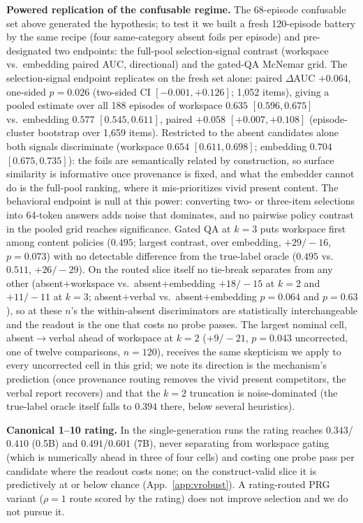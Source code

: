 \textbf{Powered replication of the confusable regime.} The 68-episode
confusable set above generated the hypothesis; to test it we built a fresh
120-episode battery by the same recipe (four same-category absent foils per
episode) and pre-designated two endpoints: the full-pool selection-signal
contrast (workspace vs.\ embedding paired AUC, directional) and the gated-QA
McNemar grid. The selection-signal endpoint replicates on the fresh set
alone: paired $\Delta$AUC $+0.064$, one-sided $p{=}0.026$ (two-sided CI
$[-0.001, +0.126]$; 1{,}052 items), giving a pooled estimate over all 188
episodes of workspace $0.635$ $[0.596, 0.675]$ vs.\ embedding $0.577$
$[0.545, 0.611]$, paired $+0.058$ $[+0.007, +0.108]$ (episode-cluster
bootstrap over 1{,}659 items). Restricted to
the absent candidates alone both signals discriminate (workspace $0.654$
$[0.611, 0.698]$; embedding $0.704$ $[0.675, 0.735]$): the foils are
semantically related by construction, so surface similarity is informative
once provenance is fixed, and what the embedder cannot do is the full-pool
ranking, where it mis-prioritizes vivid present content. The behavioral
endpoint is null at this power: converting two- or
three-item selections into 64-token answers adds noise that dominates, and
no pairwise policy contrast in the pooled grid reaches significance.
Gated QA at $k{=}3$ puts workspace first among content policies
($0.495$; largest contrast, over embedding, $+29/-16$, $p{=}0.073$) with no
detectable difference from the true-label oracle ($0.495$ vs.\ $0.511$,
$+26/-29$). On the routed slice itself no tie-break separates from any
other (absent$+$workspace vs.\ absent$+$embedding $+18/-15$ at $k{=}2$ and
$+11/-11$ at $k{=}3$; absent$+$verbal vs.\ absent$+$embedding $p{=}0.064$
and $p{=}0.63$), so at these $n$'s the within-absent discriminators are
statistically interchangeable and the readout is the one that costs no
probe passes. The largest nominal cell, absent$\to$verbal ahead of
workspace at $k{=}2$ ($+9/-21$, $p{=}0.043$ uncorrected, one of twelve
comparisons, $n{=}120$), receives the same skepticism we apply to every
uncorrected cell in this grid; we note its direction is the mechanism's
prediction (once provenance routing removes the vivid present competitors,
the verbal report recovers) and that the $k{=}2$ truncation is
noise-dominated (the true-label oracle itself falls to $0.394$ there, below
several heuristics).

\textbf{Canonical 1--10 rating.} In the single-generation runs the rating
reaches $0.343$/$0.410$ (0.5B) and $0.491$/$0.601$ (7B), never separating
from workspace gating (which is numerically ahead in three of four cells) and
costing one probe pass per candidate where the readout costs none; on the
construct-valid slice it is predictively at or below chance
(App.~\ref{app:vrobust}). A rating-routed PRG variant ($\rho{=}1$ route
scored by the rating) does not improve selection and we do not pursue it.

